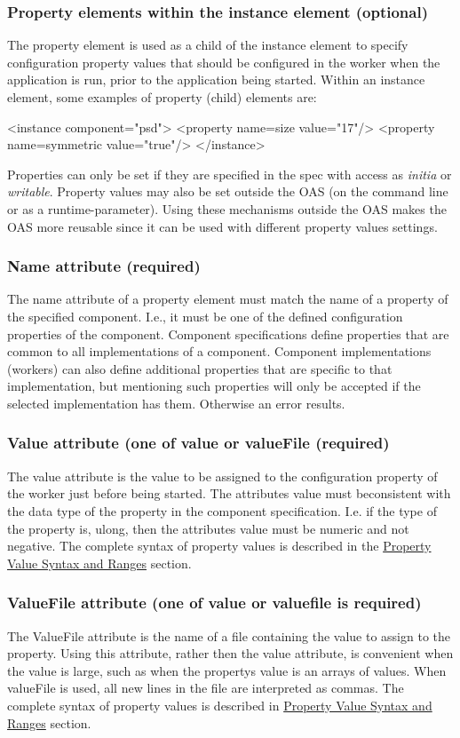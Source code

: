 \documentclass[10pt, a4paper, oneside]{article}
\renewcommand\_{\textunderscore\allowbreak} %
\begin{document}
\subsubsection{Property elements within the instance element (optional)} The property element is used as a child of the instance element to specify configuration property values that should be configured in the worker when the application is run, prior to the application being started. Within an instance element, some examples of property (child) elements are:
\begin{ocpixml}
	<instance component="psd">
  		<property name=size value="17"/>
  		<property name=symmetric value="true"/>
	</instance>\end{ocpixml}
Properties can only be set if they are specified in the spec with access as \emph{initia} or \emph{writable}.  Property values may also be set outside the OAS (on the command line or as a runtime-parameter).  Using these mechanisms outside the OAS makes the OAS more reusable since it can be used with different property values settings.
\subsubsection{Name attribute (required)}The name attribute of a property element must match the name of a property of the specified component. I.e., it must be one of the defined configuration properties of the component. Component specifications define properties that are common to all implementations of a component. Component implementations (workers) can also define additional properties that are specific to that implementation, but mentioning such properties will only be accepted if the selected implementation has them. Otherwise an error results.
\subsubsection{Value attribute (one of value or valueFile (required)} The value attribute is the value to be assigned to the configuration property of the worker just before being started.  The attributes value must beconsistent with the data type of the property in the component specification.  I.e. if the type of the property is, ulong, then the attributes value must be numeric and not negative. The complete syntax of property values is described in the \hyperlink{sec:Property Value Syntax and Ranges}{Property Value Syntax and Ranges} section.
\subsubsection{ValueFile attribute (one of  value or valuefile is required)} The ValueFile attribute is the name of a file containing the value to assign to the property.  Using this attribute, rather then the value attribute, is convenient when the value is large, such as when the propertys value is an arrays of values.  When valueFile is used, all new lines in the file are interpreted as commas. The complete syntax of property values is described in \hyperlink{sec:Property Value Syntax and Ranges}{Property Value Syntax and Ranges} section.
\end{document}

